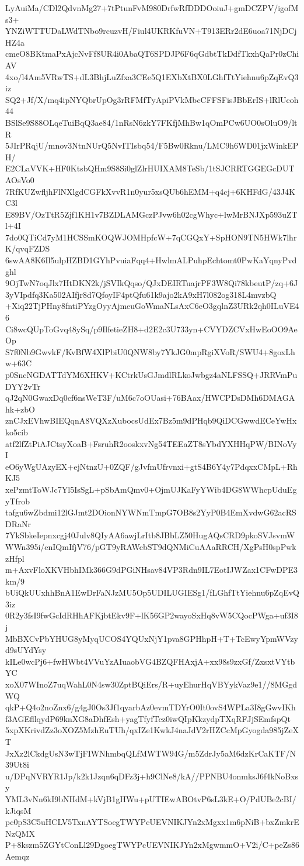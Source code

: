 LyAuiMa/CDl2QdvnMg27+7tPtunFvM980DrfwRfDDDOoiuJ+gmDCZPV/igofMs3+
YNZiWTTUDaLWdTNbo9rcuzvH/Fiul4UKRKfuVN+T913ERr2dE6uoa71NjDCjHZ4a
cmeO8BKtmaPxAjcNvFf8UR4i0AbaQT6SPDJP6F6qGdbtTkDdfTkxhQaPr0zChiAV
4xo/l4Am5VRwTS+dL3BhjLuZfxa3CEe5Q1EXbXtBX0LGhfTtYiehnu6pZqEvQ3iz
SQ2+Jf/X/mq4ipNYQbrUpOg3rRFMfTyApiPVkMbcCFFSFisJBbErIS+lRlUcoh44
BSlSe9S88OLqeTuiBqQ3ae84/1nRsN6zkY7FKfjMhBw1qOmPCw6UO0sOluO9/ltR
5JIrPRqjU/mnov3NtnNUrQ5NvITIsbq54/F5Bw0Rknu/LMC9h6WD01jxWinkEPH/
E2CLaVVK+HF0KtsbQHm9S8Si0glZlrHUIXAM8TeSb/1tSJCRRTGGEGcDUTAOsVo0
7RfKUZwfljhFlNXlgdCGFkXvvR1n0yur5xsQUb6hEMM+q4cj+6KHFdG/43J4KC3l
E89BV/OzTtR5Zjf1KH1v7BZDLAMGczPJvw6h02cgWhyc+lwMrBNJXp593uZTl+4I
7do0QTiCd7yM1HCSSmKOQWJOMHpfcW+7qCGQxY+SpHON9TN5HWk7lhrK/qvqFZDS
6swAA8K6Il5ulpHZBD1GYhPvuiaFqq4+HwlmALPuhpEchtomt0PwKaYqnyPvdghl
9OjTwN7oqJlx7HtDKN2k/jSVIkQqso/QJxDEIRTuajrPF3W8Qi78kbeutP/zq+6J
3yVIpdfq3Ka502AIfjr8d7QfoyIF4ptQfu61k9ajo2kA9xH7l082og318L4mvzbQ
+Xiq22TjPHny8fntiPYzgOyyAjmeuGoWmaNLsAxC6eO3gqlnZ3URk2qh0ILuVE46
Ci8wcQUpToGvq48ySq/p9IlfetieZH8+d2E2c3U733yn+CVYDZCVxHwEoOO9AeOp
S7f0Nb9GwvkF/KvBfW4XlPbiU0QNW8by7YkJG0mpRgiXVoR/SWU4+8goxLhw+63C
p0SncNGDATTdYM6XHKV+KCtrkUsGJmdlRLkoJwbgz4aNLFSSQ+JRRVmPuDYY2vTr
qJ2qN0GwaxDq0cf6nsWeT3F/uM6c7oOUasi+76BAax/HWCPDsDMh6DMAGAhk+zbO
znCJxEVhwBIEQqnA8VQXzXubocsUdEx7Bz5m9dPHqb9QiDCGwwdECeYwHxko5cib
atf2lfZtPiAJCtsyXoaB+FsruhR2ooskxvNg54TEEaZT8sYbdYXHHqPW/BINoVyI
eO6yWgUAzyEX+ejNtnzU+0ZQF/gJvfmUfrvnxi+gtS4B6Y4y7PdqxxCMpL+RhKJ5
xePzmtToWJc7Yl5IsSgL+pSbAmQmv0+OjmUJKaFyYWib4DG8WWhcpUduEgyTfrob
tafgu6wZbdmi12lGJmt2DOionNYWNmTmpG7OB8s2YyP0B4EmXvdwG62acRSDRaNr
7YkSbkeIepnxcgj40Julv8QIyAA6awjLrItb8JBbLZ50HugAQsCRD9pkoSVJsvmW
WWn395i/enIQmIfjV76/pGT9yRAWcbST9dQNMiCuAAaRRCH/XgPsH0spPwkzHfpl
m+AxvFloXKVHbhIMk366G9dPGiNHsav84VP3Rdn9IL7EotIJWZax1CFwDPE3km/9
bUiQkUUxhhBnA1EwDrFaNJzMU5Op5UDILUGIESg1/fLGhfTtYiehnu6pZqEvQ3iz
0R2y3fsI9fwGcIdRHhAFKjbtEkv9F+lK56GP2wayoSxHq8vW5CQocPWga+uf3I8j
MbBXCvPbYHUG8yMyqUCOS4YQUxNjY1pva8GPHhpH+T+TcEwyYpmWVzyd9sUYdYsy
kILe0wcPj6+fwHWbt4VVuYzAIuaobVG4BZQFHAxjA+xx98s9zxGf/ZxsxtVYtbYC
xoX07WInoZ7uqWahL0N4sw30ZptBQiErs/R+uyEhurHqVBYykVaz9e1//8MGgdWQ
qkP+Q4o2noZnx6/g4gJ0Os3Jf1qyarbAz0evmTDYrO0It0ovS4WPLa3I8gGwvIKh
f3AGEfllqydP69knXG8aDhfEsh+yagTfyfTcz0iwQIpKkzydpTXqRFJjSEmfspQt
5xpXKrivdZz3oXOZ5MzhEuTUh/qxIZe1KwkJ4naJdV2rHZCcMpGyogda985jZeXT
JxXz2lCkdgUsN3wTjFIWNhmbqQLfMWTW94G/m5ZdrJy5aM6dzKrCaKTF/N39Ut8i
u/DPqNVRYR1Jp/k2k1Jzqn6qDFz3j+h9ClNe8/kA//PPNBU4onmksJ6f4kNoBxsy
YML3vNn6kI9bNHdM+kVjB1gHWu+pUTIEwABOtvP6sL3kE+O/PdUBe2cBI/kJiqsM
pc0pS3C5uHCLV5TxnAYTSoegTWYPcUEVNIKJYn2xMgxx1m6pNiB+bxZmkrENzQMX
P+8kszm5ZGYtConLl29DgoegTWYPcUEVNIKJYn2xMgwmmO+V2i/C+peZs86Aemqz
